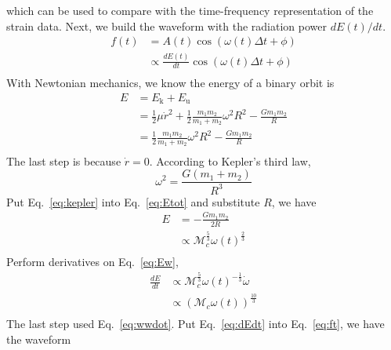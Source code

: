 \documentclass[twoside,twocolumn]{article}
\begin{document}
which can be used to compare with the time-frequency representation of the strain data.
Next, we build the waveform with the radiation power $dE(t)/dt$.
\begin{equation}\label{eq:ft}
  \begin{split}
    f(t) &= A(t)\cos(\omega(t)\Delta t +\phi) \\
    &\propto \frac{dE(t)}{dt}\cos(\omega(t)\Delta t +\phi) \\
  \end{split}
\end{equation}
With Newtonian mechanics, we know the energy of a binary orbit is
\begin{equation}\label{eq:Etot}
  \begin{split}
    E &= E_{\mathrm{k}} + E_{\mathrm{u}} \\
    &= \frac{1}{2}\mu\dot{r}^{2} + \frac{1}{2}\frac{m_{1}m_{2}}{m_{1}+m_{2}}\omega^{2}R^{2} - \frac{Gm_{1}m_{2}}{R} \\
    &= \frac{1}{2}\frac{m_{1}m_{2}}{m_{1}+m_{2}}\omega^{2}R^{2} - \frac{Gm_{1}m_{2}}{R} \\
  \end{split}
\end{equation}
The last step is because $\dot{r} = 0$. According to Kepler's third law,
\begin{equation}\label{eq:kepler}
  \omega^{2} = \frac{G(m_{1}+m_{2})}{R^{3}}
\end{equation}
Put Eq.~\eqref{eq:kepler} into Eq.~\eqref{eq:Etot} and substitute $R$, we have
\begin{equation}\label{eq:Ew}
  \begin{split}
    E &= -\frac{Gm_{1}m_{2}}{2R} \\
    &\propto \mathcal{M}_{c}^{\frac{5}{3}}\omega(t)^{\frac{2}{3}} \\
  \end{split}
\end{equation}
Perform derivatives on Eq.~\eqref{eq:Ew},
\begin{equation}\label{eq:dEdt}
  \begin{split}
    \frac{dE}{dt} &\propto \mathcal{M}_{c}^{\frac{5}{3}}\omega(t)^{-\frac{1}{3}}\dot{\omega} \\
    &\propto \left(\mathcal{M}_{c}\omega(t)\right)^{\frac{10}{3}} \\
  \end{split}
\end{equation}
The last step used Eq.~\eqref{eq:wwdot}. Put Eq.~\eqref{eq:dEdt} into Eq.~\eqref{eq:ft}, we have the waveform
\end{document}
